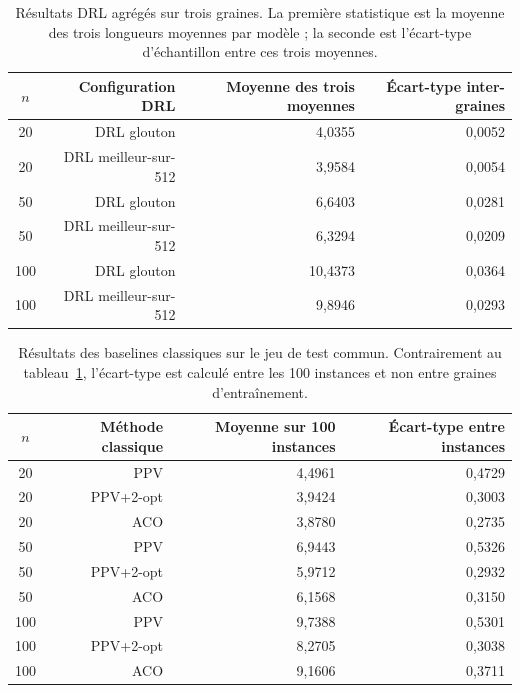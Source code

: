 \documentclass[12pt, a4paper, twoside, openright]{book}
\begin{document}
\begin{table}[H]
\centering
\small
\begin{tabular}{crrr}
\toprule
$n$ & Configuration DRL & Moyenne des trois moyennes & Écart-type inter-graines \\
\midrule
20  & DRL glouton          & 4,0355  & 0,0052 \\
20  & DRL meilleur-sur-512 & 3,9584  & 0,0054 \\
50  & DRL glouton          & 6,6403  & 0,0281 \\
50  & DRL meilleur-sur-512 & 6,3294  & 0,0209 \\
100 & DRL glouton          & 10,4373 & 0,0364 \\
100 & DRL meilleur-sur-512 & 9,8946  & 0,0293 \\
\bottomrule
\end{tabular}
\caption{Résultats DRL agrégés sur trois graines. La première statistique est la moyenne des trois longueurs moyennes par modèle ; la seconde est l'écart-type d'échantillon entre ces trois moyennes.}
\label{tab:multiseed-drl}
\end{table}

\begin{table}[H]
\centering
\small
\begin{tabular}{crrr}
\toprule
$n$ & Méthode classique & Moyenne sur 100 instances & Écart-type entre instances \\
\midrule
20  & PPV          & 4,4961 & 0,4729 \\
20  & PPV+2-opt    & 3,9424 & 0,3003 \\
20  & ACO          & 3,8780 & 0,2735 \\
\midrule
50  & PPV          & 6,9443 & 0,5326 \\
50  & PPV+2-opt    & 5,9712 & 0,2932 \\
50  & ACO          & 6,1568 & 0,3150 \\
\midrule
100 & PPV          & 9,7388 & 0,5301 \\
100 & PPV+2-opt    & 8,2705 & 0,3038 \\
100 & ACO          & 9,1606 & 0,3711 \\
\bottomrule
\end{tabular}
\caption{Résultats des baselines classiques sur le jeu de test commun. Contrairement au tableau~\ref{tab:multiseed-drl}, l'écart-type est calculé entre les 100 instances et non entre graines d'entraînement.}
\label{tab:multiseed-baselines}
\end{table}
\end{document}
